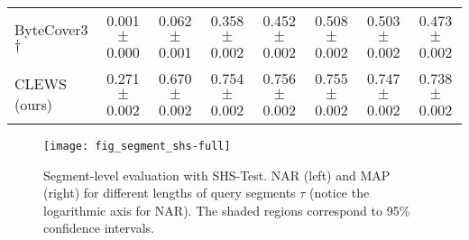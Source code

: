\begin{table*}[h]
\begin{adjustbox}{max width=\textwidth}
\begin{sc}
\begin{tabular}{lccccccc}
ByteCover3 $\dag$ & 0.001 $\pm$ 0.000 & 0.062 $\pm$ 0.001 & 0.358 $\pm$ 0.002 & 0.452 $\pm$ 0.002 & 0.508 $\pm$ 0.002 & 0.503 $\pm$ 0.002 & 0.473 $\pm$ 0.002 \\
CLEWS (ours) & 0.271 $\pm$ 0.002 & 0.670 $\pm$ 0.002 & 0.754 $\pm$ 0.002 & 0.756 $\pm$ 0.002 & 0.755 $\pm$ 0.002 & 0.747 $\pm$ 0.002 & 0.738 $\pm$ 0.002 \\
\bottomrule
\end{tabular}
\end{sc}
\end{adjustbox}
\end{table*}

\vfill

\begin{figure}[h]
\centerline{\texttt{[image: fig\_segment\_shs-full]}}
\vskip -0.15in
\caption{Segment-level evaluation with SHS-Test. NAR (left) and MAP (right) for different lengths of query segments $\tau$ (notice the logarithmic axis for NAR). The shaded regions correspond to 95\% confidence intervals.}
\label{fig:seg_shs}
\end{figure}


